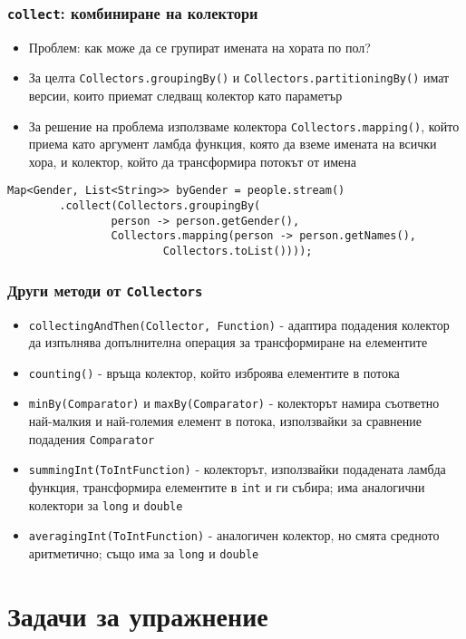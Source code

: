 \documentclass[ignorenonframetext, hyperref=unicode,compress,pdflatex]{beamer}
\begin{document}
\begin{frame}[containsverbatim]\frametitle{\lstinline{collect}: комбиниране на
колектори}
\begin{itemize}
  \item Проблем: как може да се групират имената на хората по пол? 
  \item За целта \lstinline{Collectors.groupingBy()} и
  \lstinline{Collectors.partitioningBy()} имат версии, които приемат следващ
  колектор като параметър
  \item За решение на проблема използваме колектора
  \lstinline{Collectors.mapping()}, който приема като аргумент ламбда
  функция, която да вземе имената на всички хора, и колектор, който да
  трансформира потокът от имена
\end{itemize}
\begin{lstlisting}
Map<Gender, List<String>> byGender = people.stream()
		.collect(Collectors.groupingBy(
				person -> person.getGender(),
				Collectors.mapping(person -> person.getNames(),
						Collectors.toList())));
\end{lstlisting}
\end{frame}

\begin{frame}[containsverbatim]\frametitle{Други методи от
\lstinline{Collectors}}
\begin{itemize}
  \item \lstinline{collectingAndThen(Collector, Function)} - 
  адаптира подадения колектор да изпълнява допълнителна операция за
  трансформиране на елементите
  \item \lstinline{counting()} - връща колектор, който изброява елементите в
  потока
  \item \lstinline{minBy(Comparator)} и \lstinline{maxBy(Comparator)} -
  колекторът намира съответно най-малкия и най-големия елемент в потока,
  използвайки за сравнение подадения \lstinline{Comparator}
  \item \lstinline{summingInt(ToIntFunction)} - колекторът, използвайки
  подадената ламбда функция, трансформира елементите в \lstinline{int} и ги
  събира; има аналогични колектори за \lstinline{long} и \lstinline{double}
  \item \lstinline{averagingInt(ToIntFunction)} - аналогичен колектор, но
  смята средното аритметично; също има за \lstinline{long} и \lstinline{double}
\end{itemize}
\end{frame}

\section{Задачи за упражнение}
\end{document}
